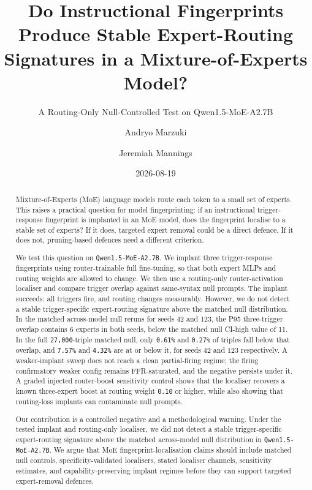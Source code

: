 \documentclass[
  11pt,
  a4paper,
]{article}
\title{Do Instructional Fingerprints Produce Stable Expert-Routing
Signatures in a Mixture-of-Experts Model?}
\subtitle{A Routing-Only Null-Controlled Test on Qwen1.5-MoE-A2.7B}
\author{Andryo Marzuki \and Jeremiah Mannings}
\date{2026-08-19}
\begin{document}
\maketitle
\begin{abstract}
Mixture-of-Experts (MoE) language models route each token to a small set
of experts. This raises a practical question for model fingerprinting:
if an instructional trigger-response fingerprint is implanted in an MoE
model, does the fingerprint localise to a stable set of experts? If it
does, targeted expert removal could be a direct defence. If it does not,
pruning-based defences need a different criterion.

We test this question on \texttt{Qwen1.5-MoE-A2.7B}. We implant three
trigger-response fingerprints using router-trainable full fine-tuning,
so that both expert MLPs and routing weights are allowed to change. We
then use a routing-only router-activation localiser and compare trigger
overlap against same-syntax null prompts. The implant succeeds: all
triggers fire, and routing changes measurably. However, we do not detect
a stable trigger-specific expert-routing signature above the matched
null distribution. In the matched across-model null reruns for seeds 42
and 123, the P95 three-trigger overlap contains 6 experts in both seeds,
below the matched null CI-high value of 11. In the full
\texttt{27,000}-triple matched null, only \texttt{0.61\%} and
\texttt{0.27\%} of triples fall below that overlap, and \texttt{7.57\%}
and \texttt{4.32\%} are at or below it, for seeds 42 and 123
respectively. A weaker-implant sweep does not reach a clean
partial-firing regime; the firing confirmatory weaker config remains
FFR-saturated, and the negative persists under it. A graded injected
router-boost sensitivity control shows that the localiser recovers a
known three-expert boost at routing weight \texttt{0.10} or higher,
while also showing that routing-loss implants can contaminate null
prompts.

Our contribution is a controlled negative and a methodological warning.
Under the tested implant and routing-only localiser, we did not detect a
stable trigger-specific expert-routing signature above the matched
across-model null distribution in \texttt{Qwen1.5-MoE-A2.7B}. We argue
that MoE fingerprint-localisation claims should include matched null
controls, specificity-validated localisers, stated localiser channels,
sensitivity estimates, and capability-preserving implant regimes before
they can support targeted expert-removal defences.
\end{abstract}
\end{document}
